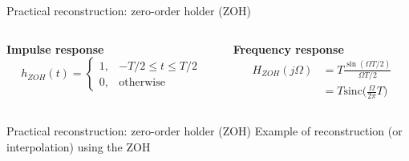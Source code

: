 \documentclass[10pt, aspectratio=169]{beamer}
\begin{document}
\begin{frame}{Practical reconstruction: zero-order holder (ZOH)}
	\begin{columns}[t]
		\begin{column}{0.5\textwidth}
			\textbf{Impulse response}
			\begin{equation*}
				h_{ZOH}(t) = \begin{cases}
				1, & -T/2 \leq t \leq T/2 \\
				0, & \text{otherwise}
				\end{cases} 
			\end{equation*}
		\end{column}
			\begin{column}{0.5\textwidth}
				\textbf{Frequency response}
				\begin{align*}
					H_{ZOH}(j\Omega) &= T\frac{\sin(\Omega T/2)}{\Omega T/2} \\
					&= T\mathrm{sinc}\Big(\frac{\Omega}{2\pi} T\Big)
				\end{align*}
		\end{column}
	\end{columns}
	\begin{center}
	\resizebox{0.8\linewidth}{!}{}
\end{center}
\end{frame}

\begin{frame}{Practical reconstruction: zero-order holder (ZOH)}
	Example of reconstruction (or interpolation) using the ZOH
	\begin{center}
		\resizebox{0.7\linewidth}{!}{}
	\end{center}	
\end{frame}
\end{document}
